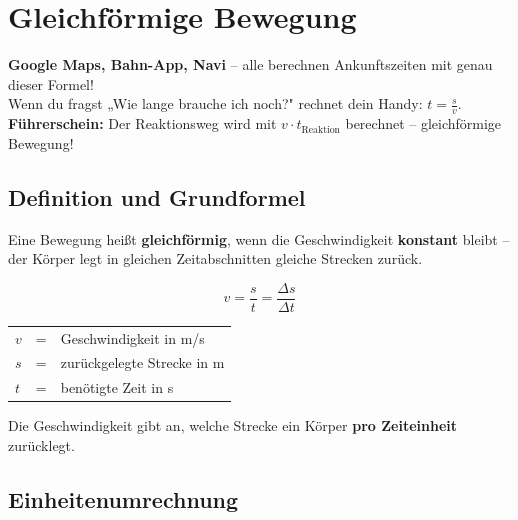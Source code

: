 \documentclass[11pt,a4paper]{article}
\begin{document}
\newpage

\section{Gleichförmige Bewegung}

\begin{alltag}
\textbf{Google Maps, Bahn-App, Navi} -- alle berechnen Ankunftszeiten mit genau dieser Formel!\\[0.3em]
Wenn du fragst „Wie lange brauche ich noch?" rechnet dein Handy: $t = \frac{s}{v}$.\\[0.3em]
\textbf{Führerschein:} Der Reaktionsweg wird mit $v \cdot t_{\text{Reaktion}}$ berechnet -- gleichförmige Bewegung!
\end{alltag}

\subsection{Definition und Grundformel}

Eine Bewegung heißt \textbf{gleichförmig}, wenn die Geschwindigkeit \textbf{konstant} bleibt -- der Körper legt in gleichen Zeitabschnitten gleiche Strecken zurück.

\begin{formelbox}
\[
\boxed{v = \frac{s}{t} = \frac{\Delta s}{\Delta t}}
\]
\begin{center}
\begin{tabular}{lcl}
$v$ & = & Geschwindigkeit in m/s \\
$s$ & = & zurückgelegte Strecke in m \\
$t$ & = & benötigte Zeit in s
\end{tabular}
\end{center}
\end{formelbox}

\begin{merksatz}
Die Geschwindigkeit gibt an, welche Strecke ein Körper \textbf{pro Zeiteinheit} zurücklegt.
\end{merksatz}

\subsection{Einheitenumrechnung}
\end{document}
